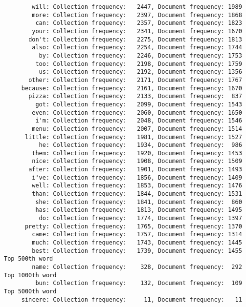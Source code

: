 \documentclass{article}
\begin{document}
\begin{verbatim}
        will: Collection frequency:   2447, Document frequency: 1989
        more: Collection frequency:   2397, Document frequency: 1868
         can: Collection frequency:   2357, Document frequency: 1823
        your: Collection frequency:   2341, Document frequency: 1670
       don't: Collection frequency:   2275, Document frequency: 1813
        also: Collection frequency:   2254, Document frequency: 1744
          by: Collection frequency:   2246, Document frequency: 1753
         too: Collection frequency:   2198, Document frequency: 1759
          us: Collection frequency:   2192, Document frequency: 1356
       other: Collection frequency:   2171, Document frequency: 1767
     because: Collection frequency:   2161, Document frequency: 1670
       pizza: Collection frequency:   2133, Document frequency:  837
         got: Collection frequency:   2099, Document frequency: 1543
        even: Collection frequency:   2060, Document frequency: 1650
         i'm: Collection frequency:   2048, Document frequency: 1546
        menu: Collection frequency:   2007, Document frequency: 1514
      little: Collection frequency:   1981, Document frequency: 1527
          he: Collection frequency:   1934, Document frequency:  986
        them: Collection frequency:   1920, Document frequency: 1453
        nice: Collection frequency:   1908, Document frequency: 1509
       after: Collection frequency:   1901, Document frequency: 1493
        i've: Collection frequency:   1856, Document frequency: 1409
        well: Collection frequency:   1853, Document frequency: 1476
        than: Collection frequency:   1844, Document frequency: 1531
         she: Collection frequency:   1841, Document frequency:  860
         has: Collection frequency:   1813, Document frequency: 1495
          do: Collection frequency:   1774, Document frequency: 1397
      pretty: Collection frequency:   1765, Document frequency: 1370
        came: Collection frequency:   1757, Document frequency: 1314
        much: Collection frequency:   1743, Document frequency: 1445
        best: Collection frequency:   1739, Document frequency: 1455
Top 500th word
        name: Collection frequency:    328, Document frequency:  292
Top 1000th word
         bun: Collection frequency:    132, Document frequency:  109
Top 5000th word
     sincere: Collection frequency:     11, Document frequency:   11

\end{verbatim}
\end{document}
